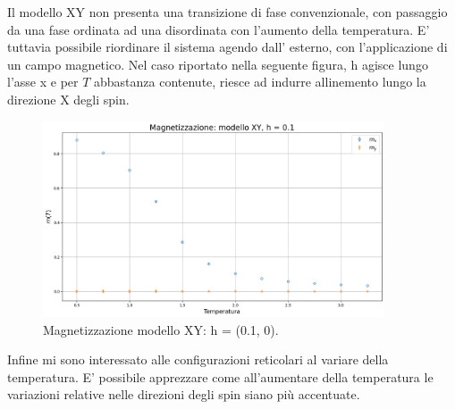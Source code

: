Il modello XY non presenta una transizione di fase convenzionale, con passaggio da una fase ordinata ad 
una disordinata con l'aumento della temperatura. E' tuttavia possibile riordinare il sistema agendo dall'
esterno, con l'applicazione di un campo magnetico. Nel caso riportato nella seguente figura, h agisce lungo l'asse x e per 
$T$ abbastanza contenute, riesce ad indurre allinemento lungo la direzione X degli spin.

\begin{figure}[H]
  \centering
  \includegraphics[width=0.9\textwidth]{Immagini/simModelloXY/magnX.png}
  \caption{Magnetizzazione modello XY: h = (0.1, 0).}
  \label{fig: magnX_XY}
\end{figure}

Infine mi sono interessato alle configurazioni reticolari al variare della temperatura. E' possibile 
apprezzare come all'aumentare della temperatura le variazioni relative nelle direzioni degli spin siano  
più accentuate.


